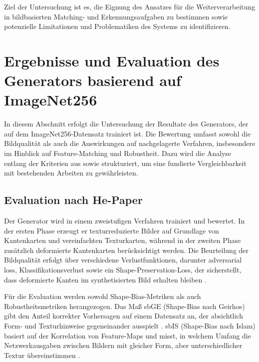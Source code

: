 Ziel der Untersuchung ist es, die Eignung des Ansatzes für die Weiterverarbeitung in bildbasierten Matching- und Erkennungsaufgaben zu bestimmen sowie potenzielle Limitationen und Problematiken des Systems zu identifizieren.





\section{Ergebnisse und Evaluation des Generators basierend auf ImageNet256}
\label{sec:ErgebEvalGenImageNet256}

In diesem Abschnitt erfolgt die Untersuchung der Resultate des Generators, der auf dem ImageNet256-Datensatz trainiert ist. 
Die Bewertung umfasst sowohl die Bildqualität als auch die Auswirkungen auf nachgelagerte Verfahren, insbesondere im Hinblick auf Feature-Matching und Robustheit. 
Dazu wird die Analyse entlang der Kriterien aus \textcite{He_2023_ICCV} sowie \textcite{potje2024xfeat} strukturiert, um eine fundierte Vergleichbarkeit mit bestehenden Arbeiten zu gewährleisten.




\subsection{Evaluation nach He-Paper}
\label{subsec:Eval_He_ImageNet256}
Der Generator wird in einem zweistufigen Verfahren trainiert und bewertet. In der ersten Phase erzeugt er 
texturreduzierte Bilder auf Grundlage von Kantenkarten und vereinfachten Texturkarten, während in der zweiten 
Phase zusätzlich deformierte Kantenkarten berücksichtigt werden. Die Beurteilung der Bildqualität erfolgt über 
verschiedene Verlustfunktionen, darunter adversarial loss, Klassifikationsverlust sowie ein 
Shape-Preservation-Loss, der sicherstellt, dass deformierte Kanten im synthetisierten Bild erhalten 
bleiben \cite{He_2023_ICCV}.

Für die Evaluation werden sowohl Shape-Bias-Metriken als auch Robustheitsmetriken herangezogen. 
Das Maß sbGE (Shape-Bias nach Geirhos) gibt den Anteil korrekter Vorhersagen auf einem Datensatz an, der 
absichtlich Form- und Texturhinweise gegeneinander ausspielt \cite{geirhos2018texturevsshape}.
sbIS (Shape-Bias nach Islam) basiert auf der Korrelation von Feature-Maps und misst, in welchem Umfang die 
Netzwerkausgaben zwischen Bildern mit gleicher Form, aber unterschiedlicher Textur 
übereinstimmen \cite{islam2021shape}.

